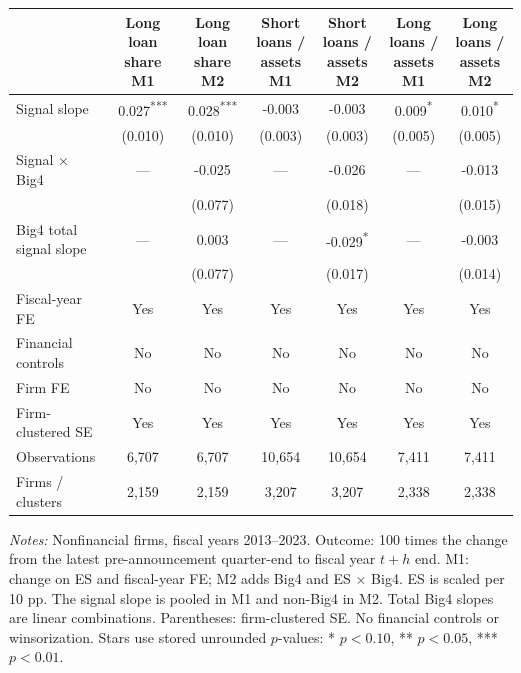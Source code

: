 \documentclass[10pt]{article}
\newcommand{\sym}[1]{\textsuperscript{#1}}
\begin{document}
\begin{minipage}{24cm}\fontsize{10.5}{13}\selectfont\centering
\setlength{\tabcolsep}{4pt}\renewcommand{\arraystretch}{1.12}
\begin{tabular*}{\textwidth}{@{\extracolsep{\fill}}lcccccc@{}}\toprule
 & \shortstack{Long loan share\\M1} & \shortstack{Long loan share\\M2} & \shortstack{Short loans / assets\\M1} & \shortstack{Short loans / assets\\M2} & \shortstack{Long loans / assets\\M1} & \shortstack{Long loans / assets\\M2} \\
\midrule
Signal slope & 0.027\sym{***} & 0.028\sym{***} & -0.003 & -0.003 & 0.009\sym{*} & 0.010\sym{*} \\
 & (0.010) & (0.010) & (0.003) & (0.003) & (0.005) & (0.005) \\
Signal $\times$ Big4 & --- & -0.025 & --- & -0.026 & --- & -0.013 \\
 &  & (0.077) &  & (0.018) &  & (0.015) \\
Big4 total signal slope & --- & 0.003 & --- & -0.029\sym{*} & --- & -0.003 \\
 &  & (0.077) &  & (0.017) &  & (0.014) \\
\addlinespace
Fiscal-year FE & Yes & Yes & Yes & Yes & Yes & Yes \\
Financial controls & No & No & No & No & No & No \\
Firm FE & No & No & No & No & No & No \\
Firm-clustered SE & Yes & Yes & Yes & Yes & Yes & Yes \\
Observations & 6,707 & 6,707 & 10,654 & 10,654 & 7,411 & 7,411 \\
Firms / clusters & 2,159 & 2,159 & 3,207 & 3,207 & 2,338 & 2,338 \\
\bottomrule\end{tabular*}
\par\medskip\raggedright\fontsize{9}{11}\selectfont
\textit{Notes:} Nonfinancial firms, fiscal years 2013--2023. Outcome: 100 times the change from the latest pre-announcement quarter-end to fiscal year $t+h$ end. M1: change on ES and fiscal-year FE; M2 adds Big4 and ES $\times$ Big4. ES is scaled per 10 pp. The signal slope is pooled in M1 and non-Big4 in M2. Total Big4 slopes are linear combinations. Parentheses: firm-clustered SE. No financial controls or winsorization. Stars use stored unrounded $p$-values: * $p<0.10$, ** $p<0.05$, *** $p<0.01$.
\end{minipage}
\end{document}

